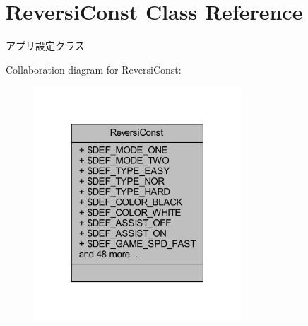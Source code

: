 \hypertarget{class_reversi_const}{}\section{Reversi\+Const Class Reference}
\label{class_reversi_const}


アプリ設定クラス  




Collaboration diagram for Reversi\+Const\+:
\nopagebreak
\begin{figure}[H]
\begin{center}
\leavevmode
\includegraphics[width=220pt]{class_reversi_const__coll__graph}
\end{center}
\end{figure}

